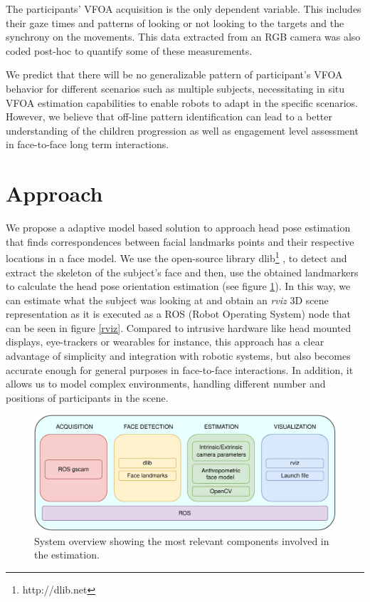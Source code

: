 \documentclass{sig-alternate}
\begin{document}
The participants' VFOA acquisition is the only dependent variable. This includes their gaze times and patterns of looking or not looking to the targets and the synchrony on the movements. This data extracted from an RGB camera was also coded post-hoc to quantify some of these measurements.

We predict that there will be no generalizable pattern of participant's VFOA behavior for different scenarios such as multiple subjects, necessitating in situ VFOA estimation capabilities to enable robots to adapt in the specific scenarios. However, we believe that off-line pattern identification can lead to a better understanding of the children progression as well as engagement level assessment in face-to-face long term interactions.

\section{Approach}

We propose a adaptive model based solution to approach head pose estimation that finds correspondences between facial landmarks points and their respective locations in a face model. We use the open-source library dlib\footnote{http://dlib.net} \cite{dlib09}, to detect and extract the skeleton of the subject's face and then, use the obtained landmarkers to calculate the head pose orientation estimation (see figure \ref{system}). In this way, we can estimate what the subject was looking at and obtain an \textit{rviz} 3D scene representation as it is executed as a ROS (Robot Operating System) node that can be seen in figure \ref{rviz}. Compared to intrusive hardware like head mounted displays, eye-trackers or wearables for instance, this approach has a clear advantage of simplicity and integration with robotic systems, but also becomes accurate enough for general purposes in face-to-face interactions. In addition, it allows us to model complex environments, handling different number and positions of participants in the scene.

\begin{figure}[h!]
    \centering
    \includegraphics[width=0.9\columnwidth]{system}
    \caption{\small System overview showing the most relevant components involved in the estimation.}
    \label{system}
\end{figure}
\end{document}
